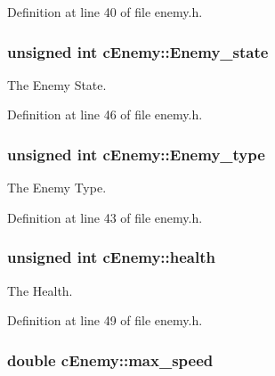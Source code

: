 Definition at line 40 of file enemy.\-h.

\hypertarget{classc_enemy_a858dd95ac9758be01aaa820745339c50}{
\subsubsection[{Enemy\-\_\-state}]{\setlength{\rightskip}{0pt plus 5cm}unsigned int c\-Enemy\-::\-Enemy\-\_\-state}}\label{classc_enemy_a858dd95ac9758be01aaa820745339c50}


The Enemy State. 



Definition at line 46 of file enemy.\-h.

\hypertarget{classc_enemy_a880c1a91dbfe21b21d42dfb4facfd8bd}{
\subsubsection[{Enemy\-\_\-type}]{\setlength{\rightskip}{0pt plus 5cm}unsigned int c\-Enemy\-::\-Enemy\-\_\-type}}\label{classc_enemy_a880c1a91dbfe21b21d42dfb4facfd8bd}


The Enemy Type. 



Definition at line 43 of file enemy.\-h.

\hypertarget{classc_enemy_a7f8cefdb27237e5639bda5136b8cb12f}{
\subsubsection[{health}]{\setlength{\rightskip}{0pt plus 5cm}unsigned int c\-Enemy\-::health}}\label{classc_enemy_a7f8cefdb27237e5639bda5136b8cb12f}


The Health. 



Definition at line 49 of file enemy.\-h.

\hypertarget{classc_enemy_a6e2b748e908bbd46d502a1c829c8201b}{
\subsubsection[{max\-\_\-speed}]{\setlength{\rightskip}{0pt plus 5cm}double c\-Enemy\-::max\-\_\-speed}}\label{classc_enemy_a6e2b748e908bbd46d502a1c829c8201b}


